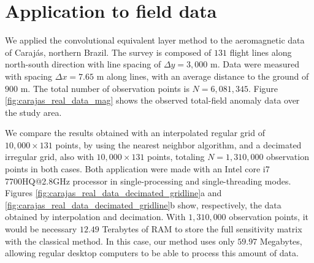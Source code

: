 \section{Application to field data}

We applied the convolutional equivalent layer method to the aeromagnetic data of Carajás, 
northern Brazil.
The survey is composed of $131$ flight lines along north-south direction with line spacing of 
$\Delta y = 3,000$ m. 
Data were measured with spacing $\Delta x = 7.65$ m along lines, with an average distance 
to the ground of $900$ m. %
The total number of observation points is $N = 6,081,345$. Figure \ref{fig:carajas_real_data_mag} 
shows the observed total-field anomaly data over the study area.

We compare the results obtained with an interpolated regular grid of $10,000 \times 131$ points, 
by using the nearest neighbor algorithm, and a decimated irregular grid, also with $10,000 \times 131$
points, totaling $N = 1,310,000$ observation points in both cases. 
Both application were made with an Intel core i7 7700HQ@2.8GHz processor in single-processing and 
single-threading modes. 
Figures \ref{fig:carajas_real_data_decimated_gridline}a and 
\ref{fig:carajas_real_data_decimated_gridline}b show, respectively, the data obtained by interpolation
and decimation. 
With $1,310,000$ observation points, it would be necessary $12.49$ Terabytes of RAM to store the full
sensitivity matrix with the classical method. 
In this case, our method uses only $59.97$ Megabytes, allowing regular desktop computers to be able 
to process this amount of data.

